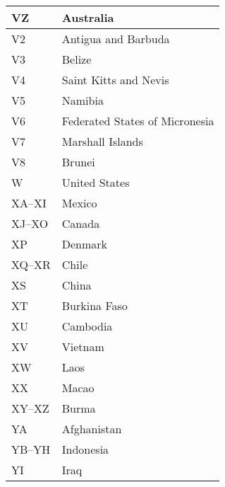 \begin{longtable}{|l|l|}
  VZ                  & Australia                                 \\
  \hline
  V2                  & Antigua and Barbuda                       \\
  \hline
  V3                  & Belize                                    \\
  \hline
  V4                  & Saint Kitts and Nevis                     \\
  \hline
  V5                  & Namibia                                   \\
  \hline
  V6                  & Federated States of Micronesia            \\
  \hline
  V7                  & Marshall Islands                          \\
  \hline
  V8                  & Brunei                                    \\
  \hline
  W                   & United States                             \\
  \hline
  XA--XI              & Mexico                                    \\
  \hline
  XJ--XO              & Canada                                    \\
  \hline
  XP                  & Denmark                                   \\
  \hline
  XQ--XR              & Chile                                     \\
  \hline
  XS                  & China                                     \\
  \hline
  XT                  & Burkina Faso                              \\
  \hline
  XU                  & Cambodia                                  \\
  \hline
  XV                  & Vietnam                                   \\
  \hline
  XW                  & Laos                                      \\
  \hline
  XX                  & Macao                                     \\
  \hline
  XY--XZ              & Burma                                     \\
  \hline
  YA                  & Afghanistan                               \\
  \hline
  YB--YH              & Indonesia                                 \\
  \hline
  YI                  & Iraq                                      \\

\end{longtable}
